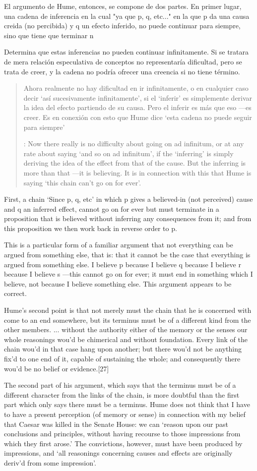 El argumento de Hume, entonces, se compone de dos partes.
  En primer lugar, una cadena de inferencia en la cual "ya que p, q, etc..."
  en la que p da una causa creida (no percibida) y q un efecto inferido, no puede continuar
para siempre, sino que tiene que terminar n

  Determina que estas inferencias no pueden continuar infinitamente. Si se tratara
  de mera relación especulativa de conceptos no representaría dificultad, pero se
  trata de creer, y la cadena no podría ofrecer una creencia si no tiene término.
  \blockquote[{\cite[2762]{anscombe2011hoc}}: Now there really is no difficulty
  about going on ad infinitum, or at any rate about saying ‘and so on ad
  infinitum’, if the ‘inferring’ is simply deriving the idea of the effect from
  that of the cause. But the inferring is more than that ---it is believing. It is
  in connection with this that Hume is saying ‘this chain can’t go on for
  ever’.]{Ahora realmente no hay dificultad en ir infinitamente, o en cualquier
    caso decir `así sucesivamente infinitamente', si el `inferir' es simplemente
    derivar la idea del efecto partiendo de su causa. Pero el inferir es más que
    eso ---es creer. Es en conexión con esto que Hume dice `esta cadena no puede
    seguir para siempre'}

  First, a chain ‘Since p, q, etc’ in which p gives a believed-in (not perceived)
  cause and q an inferred effect, cannot go on for ever but must terminate in a
  proposition that is believed without inferring any consequences from it; and
  from this proposition we then work back in reverse order to p.

  This is a particular form of a familiar argument that not everything can be
  argued from something else, that is: that it cannot be the case that everything
  is argued from something else. I believe p because I believe q because I believe
  r because I believe s ---this cannot go on for ever; it must end in something
  which I believe, not because I believe something else. This argument appears to
  be correct.

Hume’s second point is that not merely must the chain that he is concerned with
come to an end somewhere, but its terminus must be of a different kind from the
other members. ... without the authority either of the memory or the senses our
whole reasonings wou’d be chimerical and without foundation. Every link of the
chain wou’d in that case hang upon another; but there wou’d not be anything
fix’d to one end of it, capable of sustaining the whole; and consequently there
wou’d be no belief or evidence.[27]


The second part of his argument, which says that the terminus must be of a
different character from the links of the chain, is more doubtful than the first
part which only says there must be a terminus. Hume does not think that I have
to have a present perception (of memory or sense) in connection with my belief
that Caesar was killed in the Senate House: we can ‘reason upon our past
conclusions and principles, without having recourse to those impressions from
which they first arose.’ The convictions, however, must have been produced by
impressions, and ‘all reasonings concerning causes and effects are originally
deriv’d from some impression’.
